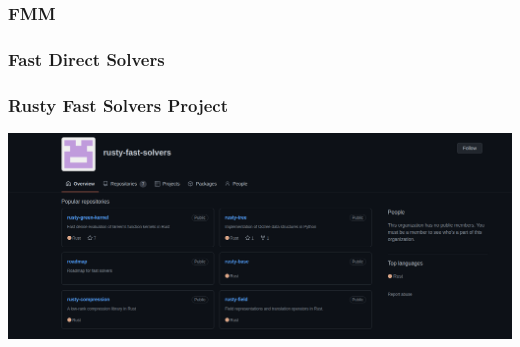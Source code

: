 \begin{frame}
    \frametitle{FMM}
\end{frame}


\begin{frame}
    \frametitle{Fast Direct Solvers}
\end{frame}

\begin{frame}
    \frametitle{Rusty Fast Solvers Project}
    \includegraphics[width=0.95\linewidth]{assets/rfs.png}
\end{frame}